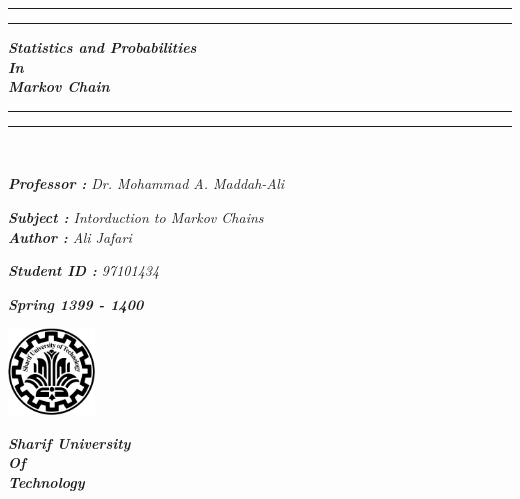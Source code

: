 \documentclass[a4paper]{article}
\begin{document}
	
	\begin{titlepage}
	
		
		\centering
		\vspace*{2\baselineskip}
		\rule{\textwidth}{2pt}\vspace*{-\baselineskip}\vspace*{3pt}
		\rule{\textwidth}{0.4pt}
		\vspace{1pt}
		
		{\Huge \bf \emph{Statistics and Probabilities \\ In \\ Markov Chain}\\}
		\vspace{0.75\baselineskip}
		
		\rule{\textwidth}{0.4pt}\vspace*{-\baselineskip}\vspace{4pt}
		\rule{\textwidth}{2.5pt}\\
		
		\vspace{3\baselineskip}
		
		{\Large\raggedleft \emph{\textbf{Professor :} Dr. Mohammad A. Maddah-Ali}}\\ \vspace{1.5cm}
		
		{\Large \emph{\textbf{Subject :} Intorduction to Markov Chains}}\\ \vspace{1.5cm}
		{\Large \emph{\textbf{Author :} Ali Jafari}}\\ \vspace{1.5cm}
		
		{\Large \emph{\textbf{Student ID :} 97101434}}\\ \vspace{1.5cm}
		
		\vspace{2cm}
		{\large \bf \emph{Spring 1399 - 1400}}
		
		\vspace*{\fill}
		{\includegraphics[width=2.3cm]{img/img1.png}}\\
		\vspace{0.3cm}
		
		{\small \bf \emph{Sharif University\\Of\\Technology}}
		
	\end{titlepage}
%
	\tableofcontents	
	\newpage
\end{document}
